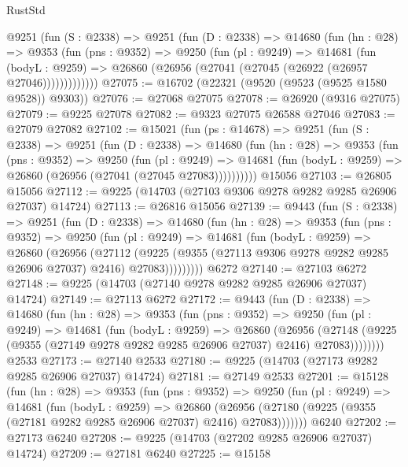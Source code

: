 \begin{lexlean}{RustStd}
\begin{coremodule}
      @9251
        (fun (S : @2338) =>
        @9251
          (fun (D : @2338) =>
          @14680
            (fun (hn : @28) =>
            @9353
              (fun (pns : @9352) =>
              @9250
                (fun (pl : @9249) =>
                @14681
                  (fun (bodyL : @9259) =>
                  @26860 (@26956 (@27041 (@27045 (@26922 (@26957 @27046)))))))))))))
@27075 := @16702 (@22321 (@9520 (@9523 (@9525 @1580 @9528)) @9303))
@27076 := @27068 @27075
@27078 := @26920 (@9316 @27075)
@27079 := @9225 @27078
@27082 := @9323 @27075 @26588 @27046
@27083 := @27079 @27082
@27102 := @15021
    (fun (ps : @14678) =>
    @9251
      (fun (S : @2338) =>
      @9251
        (fun (D : @2338) =>
        @14680
          (fun (hn : @28) =>
          @9353
            (fun (pns : @9352) =>
            @9250
              (fun (pl : @9249) =>
              @14681 (fun (bodyL : @9259) => @26860 (@26956 (@27041 (@27045 @27083))))))))))
    @15056
@27103 := @26805 @15056
@27112 := @9225 (@14703 (@27103 @9306 @9278 @9282 @9285 @26906 @27037) @14724)
@27113 := @26816 @15056
@27139 := @9443
    (fun (S : @2338) =>
    @9251
      (fun (D : @2338) =>
      @14680
        (fun (hn : @28) =>
        @9353
          (fun (pns : @9352) =>
          @9250
            (fun (pl : @9249) =>
            @14681
              (fun (bodyL : @9259) =>
              @26860
                (@26956
                  (@27112
                    (@9225
                      (@9355 (@27113 @9306 @9278 @9282 @9285 @26906 @27037) @2416)
                      @27083)))))))))
    @6272
@27140 := @27103 @6272
@27148 := @9225 (@14703 (@27140 @9278 @9282 @9285 @26906 @27037) @14724)
@27149 := @27113 @6272
@27172 := @9443
    (fun (D : @2338) =>
    @14680
      (fun (hn : @28) =>
      @9353
        (fun (pns : @9352) =>
        @9250
          (fun (pl : @9249) =>
          @14681
            (fun (bodyL : @9259) =>
            @26860
              (@26956
                (@27148 (@9225 (@9355 (@27149 @9278 @9282 @9285 @26906 @27037) @2416) @27083))))))))
    @2533
@27173 := @27140 @2533
@27180 := @9225 (@14703 (@27173 @9282 @9285 @26906 @27037) @14724)
@27181 := @27149 @2533
@27201 := @15128
    (fun (hn : @28) =>
    @9353
      (fun (pns : @9352) =>
      @9250
        (fun (pl : @9249) =>
        @14681
          (fun (bodyL : @9259) =>
          @26860
            (@26956 (@27180 (@9225 (@9355 (@27181 @9282 @9285 @26906 @27037) @2416) @27083)))))))
    @6240
@27202 := @27173 @6240
@27208 := @9225 (@14703 (@27202 @9285 @26906 @27037) @14724)
@27209 := @27181 @6240
@27225 := @15158

\end{coremodule}
\end{lexlean}
